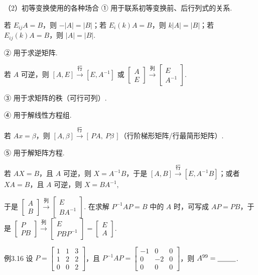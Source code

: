 \begin{fcard}{（2）初等变换使用的各种场合}
① 用于联系初等变换前、后行列式的关系.

若 $E_{ij}A=B$，则 $-|A|=|B|$；若 $E_i(k)A=B$，则 $k|A|=|B|$；若 $E_{ij}(k)A=B$，则 $|A|=|B|$.

② 用于求逆矩阵.

若 $A$ 可逆，则 $[A,E]\xrightarrow{\text{行}}[E,A^{-1}]$ 或 $\begin{bmatrix}A\\E\end{bmatrix}\xrightarrow{\text{列}}\begin{bmatrix}E\\A^{-1}\end{bmatrix}$.

③ 用于求矩阵的秩（可行可列）.

④ 用于解线性方程组.

若 $Ax=\beta$，则 $[A,\beta]\xrightarrow{\text{行}}[\,PA,\ P\beta\,]$（行阶梯形矩阵/行最简形矩阵）.

⑤ 用于解矩阵方程.

若 $AX=B$，且 $A$ 可逆，则 $X=A^{-1}B$，于是 $[A,B]\xrightarrow{\text{行}}[E,A^{-1}B]$；或者 $XA=B$，且 $A$ 可逆，则 $X=BA^{-1}$,


于是 $\begin{bmatrix}A\\B\end{bmatrix}\xrightarrow{\text{列}}\begin{bmatrix}E\\BA^{-1}\end{bmatrix}$. 在求解 $P^{-1}AP=B$ 中的 $A$ 时，可写成 $AP=PB$，于是 $\begin{bmatrix}P\\PB\end{bmatrix}\xrightarrow{\text{列}}\begin{bmatrix}E\\PBP^{-1}\end{bmatrix}=\begin{bmatrix}E\\A\end{bmatrix}$.
\end{fcard}

\begin{fcard}{例3.16}
设 $P=\begin{bmatrix}1&1&3\\1&2&2\\0&0&2\end{bmatrix}$，且 $P^{-1}AP=\begin{bmatrix}-1&0&0\\0&-2&0\\0&0&0\end{bmatrix}$，则 $A^{99}=\underline{\hspace{2.6em}}$.
\end{fcard}

